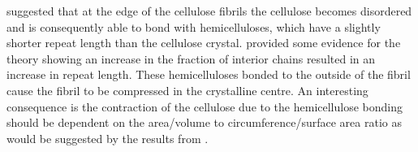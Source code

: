 \citet{walker2006primary} suggested that at the edge of the cellulose fibrils the cellulose becomes
disordered and is consequently able to bond with hemicelluloses, which have a
slightly shorter repeat length than the cellulose crystal. \citet{Davidson_2004} provided some evidence for the theory showing an increase in the fraction of interior chains resulted in an increase in repeat length. These hemicelluloses bonded to the outside of the fibril cause the fibril to be compressed in the
crystalline centre. An interesting consequence
is the contraction of the cellulose due to the hemicellulose bonding should be
dependent on the area/volume to circumference/surface area ratio as would be suggested by the results from \citet{Davidson_2004}.